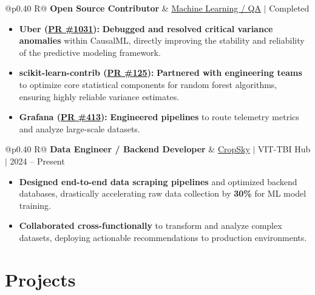 \documentclass[a4paper,11pt]{article}
\newcommand{\subheading}[1]{\textbf{#1}}
\newcommand{\meta}[1]{{\fontsize{10}{12}\selectfont\textcolor[HTML]{3A3A3A}{#1}}}
\newcommand{\ulink}[2]{\href{#1}{#2}}
\begin{document}
\begin{tabularx}{\linewidth}{@{}p{0.40\linewidth} R@{}}
\subheading{Open Source Contributor} & \meta{\ulink{https://github.com/su-jin1425/My-Open-Source-Contributions}{Machine Learning / QA} $|$ Completed}
\end{tabularx}
\begin{itemize}[nosep, leftmargin=1.5em, itemsep=2pt, topsep=2pt]
  \item {\color[HTML]{0A0A0A}\fontsize{11}{14}\selectfont \textbf{Uber (\ulink{https://github.com/uber/causalml/pull/1031}{PR \#1031}):} \textbf{Debugged and resolved critical variance anomalies} within CausalML, directly improving the stability and reliability of the predictive modeling framework.}
  \item {\color[HTML]{0A0A0A}\fontsize{11}{14}\selectfont \textbf{scikit-learn-contrib (\ulink{https://github.com/scikit-learn-contrib/forest-confidence-interval/pull/125}{PR \#125}):} \textbf{Partnered with engineering teams} to optimize core statistical components for random forest algorithms, ensuring highly reliable variance estimates.}
  \item {\color[HTML]{0A0A0A}\fontsize{11}{14}\selectfont \textbf{Grafana (\ulink{https://github.com/grafana/alloy-scenarios/pull/413}{PR \#413}):} \textbf{Engineered pipelines} to route telemetry metrics and analyze large-scale datasets.}
\end{itemize}

\begin{tabularx}{\linewidth}{@{}p{0.40\linewidth} R@{}}
\subheading{Data Engineer / Backend Developer} & \meta{\ulink{https://sites.google.com/view/cropsky/home}{CropSky} $|$ VIT-TBI Hub $|$ 2024 -- Present}
\end{tabularx}
\begin{itemize}[nosep, leftmargin=1.5em, itemsep=2pt, topsep=2pt]
  \item {\color[HTML]{0A0A0A}\fontsize{11}{14}\selectfont \textbf{Designed end-to-end data scraping pipelines} and optimized backend databases, drastically accelerating raw data collection by \textbf{30\%} for ML model training.}
  \item {\color[HTML]{0A0A0A}\fontsize{11}{14}\selectfont \textbf{Collaborated cross-functionally} to transform and analyze complex datasets, deploying actionable recommendations to production environments.}
\end{itemize}

\section{Projects}
\vspace{2pt}
\end{document}
